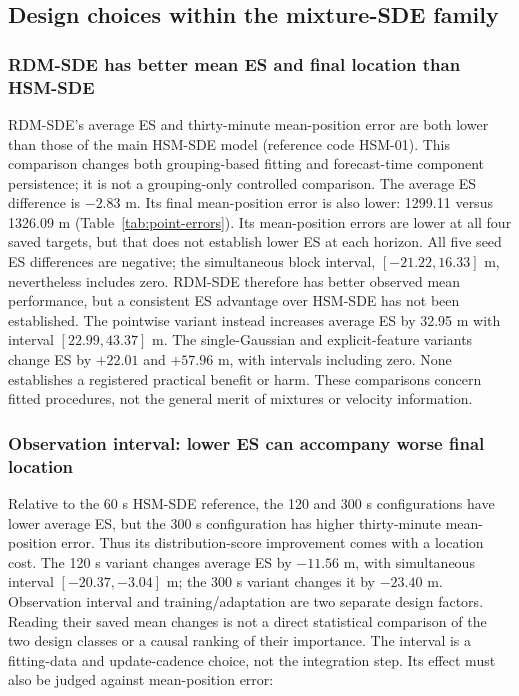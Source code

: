 \subsection{Design choices within the mixture-SDE family}\label{sec:design-choices}
\subsubsection{RDM-SDE has better mean ES and final location than HSM-SDE}
RDM-SDE's average ES and thirty-minute mean-position error are both lower
than those of the main HSM-SDE model (reference code HSM-01).
This comparison changes both grouping-based fitting and forecast-time
component persistence; it is not a grouping-only controlled comparison.
The average ES difference is $-2.83$ m.
Its final mean-position error is also lower: 1299.11 versus 1326.09 m
(Table~\ref{tab:point-errors}). Its mean-position errors are lower at all
four saved targets, but that does not establish lower ES at each horizon.
All five seed ES differences are negative; the simultaneous block interval,
$[-21.22,16.33]$ m, nevertheless includes zero. RDM-SDE therefore has
better observed mean performance, but a consistent ES advantage over
HSM-SDE has not been established.
The pointwise variant instead increases average ES by 32.95 m with interval
$[22.99,43.37]$ m. The single-Gaussian and explicit-feature variants change
ES by $+22.01$ and $+57.96$ m, with intervals including zero. None establishes
a registered practical benefit or harm. These comparisons concern fitted
procedures, not the general merit of mixtures or velocity information.

\subsubsection{Observation interval: lower ES can accompany worse final location}
Relative to the 60 s HSM-SDE reference, the 120 and 300 s configurations
have lower average ES, but the 300 s configuration has higher thirty-minute
mean-position error. Thus its distribution-score improvement comes with
a location cost. The 120 s variant changes average ES by $-11.56$ m, with simultaneous
interval $[-20.37,-3.04]$ m; the 300 s variant changes it by $-23.40$ m.
Observation interval and training/adaptation are two separate design
factors. Reading their saved mean changes is not a direct statistical
comparison of the two design classes or a causal ranking of their importance.
The interval is a fitting-data and update-cadence choice, not the integration
step. Its effect must also be judged against mean-position error:
\begingroup\renewcommand{\subsection}[1]{}

\endgroup

